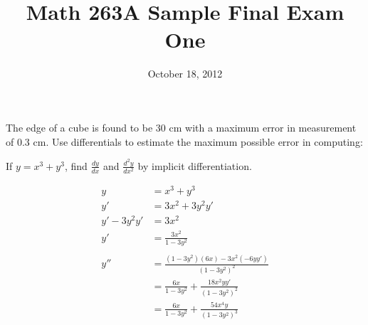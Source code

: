 \documentclass[fleqn,addpoints]{exam}
\title{Math 263A Sample Final Exam One}
\date{October 18, 2012}
\author{}
\begin{document}
\maketitle  

\begin{questions}

\question The edge of a cube is found to be 30 cm with a maximum error in measurement of 0.3 cm. Use differentials to
estimate the maximum possible error in computing:


\question If $y = x^3 + y^3$, find $\frac{dy}{dx}$ and $\frac{d^2y}{dx^2}$ by implicit differentiation.

\begin{solution}
\begin{align*}
  y &= x^3 + y^3 \\
  y' &= 3x^2 + 3y^2y' \\
  y' - 3y^2y' &= 3x^2 \\
  y' &= \frac{3x^2}{1 - 3y^2} \\
\\
  y'' &= \frac{(1 - 3y^2)(6x) - 3x^2(-6yy')}{(1 - 3y^2)^2} \\
   &= \frac{6x}{1 - 3y^2} + \frac{18x^2yy'}{(1 - 3y^2)^2} \\
   &= \frac{6x}{1 - 3y^2} + \frac{54x^4y}{(1 - 3y^2)^3} \\
\end{align*}


\end{solution}
\end{questions}
\end{document}
